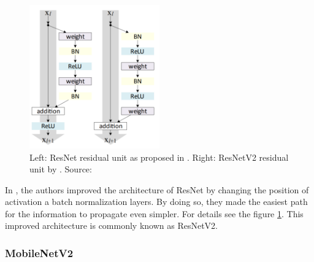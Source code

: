 \begin{figure}
    \centering
    \includegraphics[width=0.5\textwidth]{img/resnetv2.png}
    \caption[Residual units]{Left: ResNet residual unit as proposed in \citep{resnet}. Right: ResNetV2 residual unit by \citep{resnetv2}. Source: \cite{resnetv2}}
    \label{fig:resnetv2}
\end{figure}

In \citep{resnetv2}, the authors improved the architecture of ResNet by changing the position of activation a batch normalization layers. By doing so, they made the easiest path for the information to propagate even simpler. For details see the figure \ref{fig:resnetv2}. This improved architecture is commonly known as ResNetV2.




\subsubsection*{MobileNetV2}

